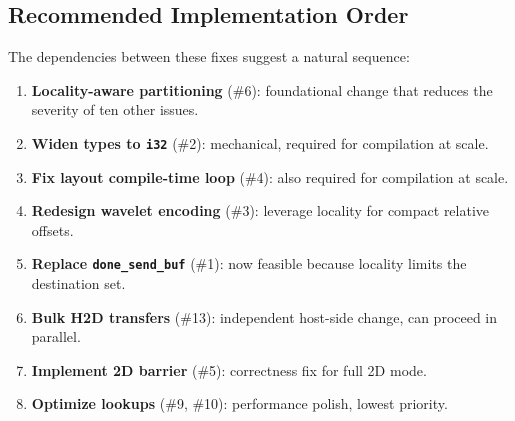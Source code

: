 \documentclass[11pt,letterpaper]{article}
\begin{document}
\subsection{Recommended Implementation Order}

The dependencies between these fixes suggest a natural sequence:

\begin{enumerate}[nosep]
  \item \textbf{Locality-aware partitioning} (\#6): foundational change that reduces the severity of ten other issues.
  \item \textbf{Widen types to \texttt{i32}} (\#2): mechanical, required for compilation at scale.
  \item \textbf{Fix layout compile-time loop} (\#4): also required for compilation at scale.
  \item \textbf{Redesign wavelet encoding} (\#3): leverage locality for compact relative offsets.
  \item \textbf{Replace \texttt{done\_send\_buf}} (\#1): now feasible because locality limits the destination set.
  \item \textbf{Bulk H2D transfers} (\#13): independent host-side change, can proceed in parallel.
  \item \textbf{Implement 2D barrier} (\#5): correctness fix for full 2D mode.
  \item \textbf{Optimize lookups} (\#9, \#10): performance polish, lowest priority.
\end{enumerate}
\end{document}
